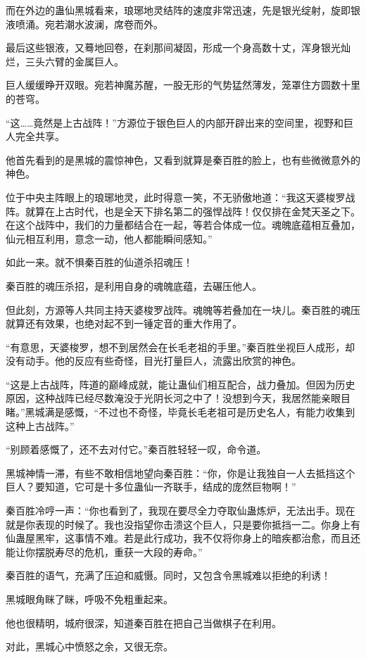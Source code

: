 \begin{this_body}
而在外边的蛊仙黑城看来，琅琊地灵结阵的速度非常迅速，先是银光绽射，旋即银液喷涌。宛若潮水波澜，席卷而外。

最后这些银液，又蓦地回卷，在刹那间凝固，形成一个身高数十丈，浑身银光灿烂，三头六臂的金属巨人。

巨人缓缓睁开双眼。宛若神魔苏醒，一股无形的气势猛然薄发，笼罩住方圆数十里的苍穹。

“这……竟然是上古战阵！”方源位于银色巨人的内部开辟出来的空间里，视野和巨人完全共享。

他首先看到的是黑城的震惊神色，又看到就算是秦百胜的脸上，也有些微微意外的神色。

位于中央主阵眼上的琅琊地灵，此时得意一笑，不无骄傲地道：“我这天婆梭罗战阵。就算在上古时代，也是全天下排名第二的强悍战阵！仅仅排在金梵天圣之下。在这个战阵中，我们的力量都结合在一起，等若合体成一位。魂魄底蕴相互叠加，仙元相互利用，意念一动，他人都能瞬间感知。”

如此一来。就不惧秦百胜的仙道杀招魂压！

秦百胜的魂压杀招，是利用自身的魂魄底蕴，去碾压他人。

但此刻，方源等人共同主持天婆梭罗战阵。魂魄等若叠加在一块儿。秦百胜的魂压就算还有效果，也绝对起不到一锤定音的重大作用了。

“有意思，天婆梭罗，想不到居然会在长毛老祖的手里。”秦百胜坐视巨人成形，却没有动手。他的反应有些奇怪，目光打量巨人，流露出欣赏的神色。

“这是上古战阵，阵道的巅峰成就，能让蛊仙们相互配合，战力叠加。但因为历史原因，这种战阵已经尽数淹没于光阴长河之中了！没想到今天，我居然能亲眼目睹。”黑城满是感慨，“不过也不奇怪，毕竟长毛老祖可是历史名人，有能力收集到这种上古战阵。”

“别顾着感慨了，还不去对付它。”秦百胜轻轻一叹，命令道。

黑城神情一滞，有些不敢相信地望向秦百胜：“你，你是让我独自一人去抵挡这个巨人？要知道，它可是十多位蛊仙一齐联手，结成的庞然巨物啊！”

秦百胜冷哼一声：“你也看到了，我现在要尽全力夺取仙蛊炼炉，无法出手。现在就是你表现的时候了。我也没指望你击溃这个巨人，只是要你抵挡一二。你身上有仙蛊屋黑牢，这事情不难。若是此行成功，我不仅将你身上的暗疾都治愈，而且还能让你摆脱寿尽的危机，重获一大段的寿命。”

秦百胜的语气，充满了压迫和威慑。同时，又包含令黑城难以拒绝的利诱！

黑城眼角眯了眯，呼吸不免粗重起来。

他也很精明，城府很深，知道秦百胜在把自己当做棋子在利用。

对此，黑城心中愤怒之余，又很无奈。


\end{this_body}
